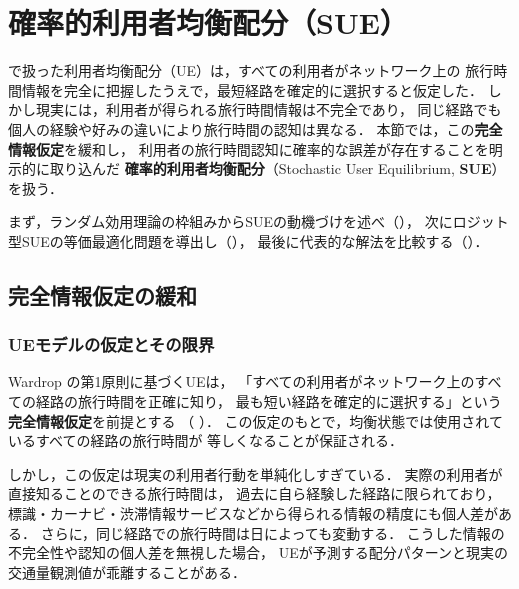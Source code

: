 
\section{確率的利用者均衡配分（SUE）}
\label{sec:ch4-sue}

で扱った利用者均衡配分（UE）は，すべての利用者がネットワーク上の
旅行時間情報を完全に把握したうえで，最短経路を確定的に選択すると仮定した．
しかし現実には，利用者が得られる旅行時間情報は不完全であり，
同じ経路でも個人の経験や好みの違いにより旅行時間の認知は異なる．
本節では，この\textbf{完全情報仮定}を緩和し，
利用者の旅行時間認知に確率的な誤差が存在することを明示的に取り込んだ
\textbf{確率的利用者均衡配分}（Stochastic User Equilibrium, \textbf{SUE}）を扱う．

まず，ランダム効用理論の枠組みからSUEの動機づけを述べ（），
次にロジット型SUEの等価最適化問題を導出し（），
最後に代表的な解法を比較する（）．

\subsection{完全情報仮定の緩和}
\label{subsec:sue-relaxation}

\subsubsection*{UEモデルの仮定とその限界}

Wardrop の第1原則に基づくUEは，
「すべての利用者がネットワーク上のすべての経路の旅行時間を正確に知り，
最も短い経路を確定的に選択する」という\textbf{完全情報仮定}を前提とする
（ ）．
この仮定のもとで，均衡状態では使用されているすべての経路の旅行時間が
等しくなることが保証される．

しかし，この仮定は現実の利用者行動を単純化しすぎている．
実際の利用者が直接知ることのできる旅行時間は，
過去に自ら経験した経路に限られており，
標識・カーナビ・渋滞情報サービスなどから得られる情報の精度にも個人差がある．
さらに，同じ経路での旅行時間は日によっても変動する．
こうした情報の不完全性や認知の個人差を無視した場合，
UEが予測する配分パターンと現実の交通量観測値が乖離することがある\cite{Daganzo1977,Sheffi1985}．

